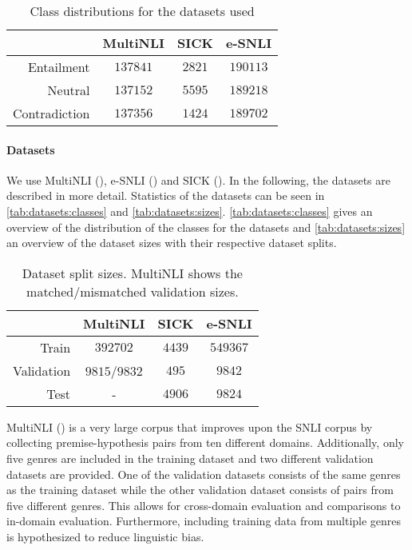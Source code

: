 \documentclass[12pt,a4paper]{article}
\begin{document}
\begin{table}[h]
    \centering
    \caption{Class distributions for the datasets used}
    \begin{tabular}{r || c | c | c}
        & \acs{MultiNLI} & \acs{SICK} & \acs{e-SNLI} \\
        \hline
        Entailment & $137841$ & $2821$ & $190113$ \\
        Neutral & $137152$ & $5595$ & $189218$ \\
        Contradiction & $137356$ & $1424$ & $189702$
    \end{tabular}
    \label{tab:datasets:classes}
\end{table}

\paragraph{Datasets} We use \acs{MultiNLI} (\cite{multinli}), \acs{e-SNLI} (\cite{esnli}) and \acs{SICK} (\cite{sick}). In the following, the datasets are described in more detail. Statistics of the datasets can be seen in \autoref{tab:datasets:classes} and \autoref{tab:datasets:sizes}. \autoref{tab:datasets:classes} gives an overview of the distribution of the classes for the datasets and \autoref{tab:datasets:sizes} an overview of the dataset sizes with their respective dataset splits.

\begin{table}[h]
    \centering
    \caption{Dataset split sizes. \acs{MultiNLI} shows the matched/mismatched validation sizes.}
    \begin{tabular}{r || c | c | c}
        & \acs{MultiNLI} & \acs{SICK} & \acs{e-SNLI} \\
        \hline
        Train & $392702$ & $4439$ & $549367$ \\
        Validation & $9815$/$9832$ & $495$ & $9842$ \\
        Test & - & $4906$ & $9824$
    \end{tabular}
    \label{tab:datasets:sizes}
\end{table}

\Acf{MultiNLI} (\cite{multinli}) is a very large corpus that improves upon the \acs{SNLI} corpus by collecting premise-hypothesis pairs from ten different domains. Additionally, only five genres are included in the training dataset and two different validation datasets are provided. One of the validation datasets consists of the same genres as the training dataset while the other validation dataset consists of pairs from five different genres. This allows for cross-domain evaluation and comparisons to in-domain evaluation. Furthermore, including training data from multiple genres is hypothesized to reduce linguistic bias.
\end{document}
